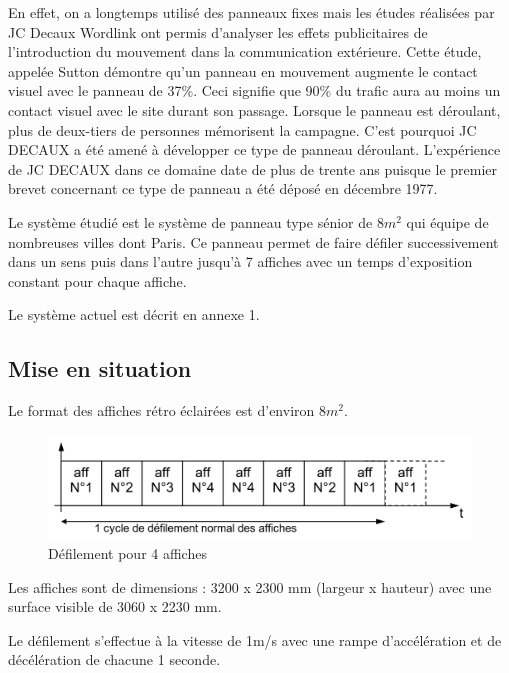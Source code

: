 En effet, on a longtemps utilisé des panneaux fixes mais les études réalisées par JC Decaux Wordlink ont permis d'analyser les effets publicitaires de l'introduction du mouvement dans la communication extérieure.
Cette étude, appelée Sutton démontre qu'un panneau en mouvement augmente le contact visuel avec le panneau de 37\%. Ceci signifie que 90\% du trafic aura au moins un contact visuel avec le site durant son passage. Lorsque le panneau est déroulant, plus de deux-tiers de personnes mémorisent la campagne. C'est pourquoi JC DECAUX a été amené à développer ce type de panneau déroulant. L'expérience de JC DECAUX dans ce domaine date de plus de trente ans puisque le premier brevet concernant ce type de panneau a été déposé en décembre 1977.

Le système étudié est le système de panneau type sénior de $8m^2$ qui équipe de nombreuses villes dont Paris.
Ce panneau permet de faire défiler successivement dans un sens puis dans l'autre jusqu'à 7 affiches avec un temps d'exposition constant pour chaque affiche. 

Le système actuel est décrit en annexe 1.

\subsection{Mise en situation}

Le format des affiches rétro éclairées est d'environ $8m^2$.

\begin{figure}[!h]
\begin{center}
	\includegraphics[width=0.6\linewidth]{img/fig00b}
\end{center}
	\label{fig00b}
	\caption{Défilement pour 4 affiches}
\end{figure}

Les affiches sont de dimensions : 3200 x 2300 mm (largeur x hauteur) avec une surface visible de 3060 x 2230 mm.

Le défilement s'effectue à la vitesse de 1m/s avec une rampe d'accélération et de décélération de chacune 1 seconde.

